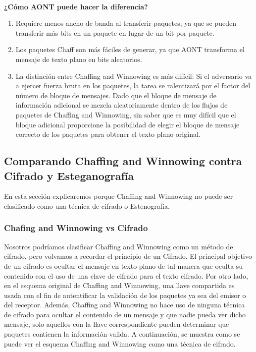 \documentclass[12pt, a4paper, titlepage]{report}
\begin{document}
        \paragraph{}
        \textbf{¿Cómo AONT puede hacer la diferencia?}\\
        
        \begin{enumerate}
            \item Requiere menos ancho de banda al transferir paquetes, ya que se pueden transferir más bits en un paquete en lugar de un bit por paquete.
            \item Los paquetes Chaff son más fáciles de generar, ya que AONT transforma el mensaje de texto plano en bits aleatorios.
            \item La distinción entre Chaffing and Winnowing es más difícil: Si el adversario va a ejercer fuerza bruta en los paquetes, la tarea se ralentizará por el factor del número de bloque de mensajes. Dado que el bloque de mensaje de información adicional se mezcla aleatoriamente dentro de los flujos de paquetes de Chaffing and Winnowing, sin saber que es muy difícil que el bloque adicional proporcione la posibilidad de elegir el bloque de mensaje correcto de los paquetes para obtener el texto plano original.
        \end{enumerate}
        
        \subsection{Comparando Chaffing and Winnowing contra Cifrado y Esteganograf\'ia}
        
        En esta sección explicaremos porque Chaffing and Winnowing no puede ser clasificado como una técnica de cifrado o Estenografía.\\
        
        \subsubsection{Chafing and Winnowing vs Cifrado}
        
        Nosotros podríamos clasificar Chaffing and Winnowing como un método de cifrado, pero volvamos a recordar el principio de un Cifrado.
        El principal objetivo de un cifrado es ocultar el mensaje en texto plano de tal manera que oculta su contenido con el uso de una clave de cifrado para el texto cifrado.
        Por otro lado, en el esquema original de Chaffing and Winnowing, una llave compartida es usada con el fin de autentificar la validación de los paquetes ya sea del emisor o del receptor. Además, Chaffing and Winnowing no hace uso de ninguna técnica de cifrado para ocultar el contenido de un mensaje y que nadie pueda ver dicho mensaje, solo aquellos con la llave correspondiente pueden determinar que paquetes contienen la información valida. A continuación, se muestra como se puede ver el esquema Chaffing and Winnowing como una técnica de cifrado. 
        
\end{document}
